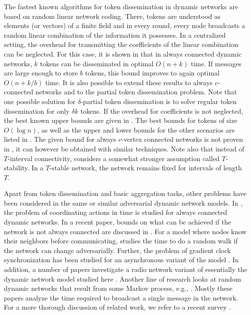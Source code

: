 \documentclass{llncs}
\begin{document}
The fastest known algorithms for token dissemination in dynamic
networks are based on random linear network coding. There, tokens are
understood as elements (or vectors) of a finite field and in every
round, every node broadcasts a random linear combination of the
information it possesses. In a centralized setting, the overhead for
transmitting the coefficients of the linear combination can be
neglected. For this case, it is shown in \cite{AnalyzingNC} that in
always connected dynamic networks, $k$ tokens can be disseminated in
optimal $O(n+k)$ time. If messages are large enough to store $b$
tokens, this bound improves to again optimal $O(n+k/b)$ time. It is
also possible to extend these results to always $c$-connected networks
and to the partial token dissemination problem. Note that one possible
solution for $\delta$-partial token dissemination is to solve regular
token dissemination for only $\delta k$ tokens. If the overhead for
coefficients is not neglected, the best known upper bounds are given
in \cite{HK}. The best bounds for tokens of size $O(\log n)$, as well
as the upper and lower bounds for the other scenarios are listed in
. The given bound for always $c$-vertex connected
networks is not proven in \cite{HK}, it can however be obtained with
similar techniques. Note also that instead of $T$-interval
connectivity, \cite{HK} considers a somewhat stronger assumption
called $T$-stability. In a $T$-stable network, the network remains
fixed for intervals of length $T$.

Apart from token dissemination and basic aggregation tasks, other
problems have been considered in the same or similar adversarial
dynamic network models. In \cite{KMO}, the problem of coordinating
actions in time is studied for always connected dynamic networks. In a
recent paper, bounds on what can be achieved if the network is not
always connected are discussed in \cite{cornejo12}. For a model where
nodes know their neighbors before communicating, \cite{avin08} studies
the time to do a random walk if the network can change
adversarially. Further, the problem of gradient clock synchronization
has been studied for an asynchronous variant of the model
\cite{clocksync}. In addition, a number of papers investigate a radio
network variant of essentially the dynamic network model studied here
\cite{anta10,clementi09,dualgraphs}. Another line of
research looks at random dynamic networks that result from some Markov
process, e.g., \cite{baumann09,clementi09b,clementi12}. Mostly these
papers analyze the time required to broadcast a single message in the
network. For a more thorough
discussion of related work, we refer to a recent survey
\cite{KOSurvey}.
\end{document}
